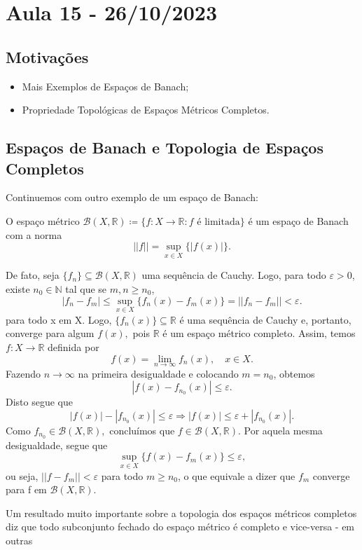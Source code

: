 \documentclass[MetricSpaces/metric_notes.tex]{subfiles}
\begin{document}
\section{Aula 15 - 26/10/2023}
\subsection{Motivações}
\begin{itemize}
	\item Mais Exemplos de Espaços de Banach;
	\item Propriedade Topológicas de Espaços Métricos Completos.
\end{itemize}
\subsection{Espaços de Banach e Topologia de Espaços Completos}
Continuemos com outro exemplo de um espaço de Banach:
\begin{example}
	O espaço métrico \(\mathcal{B}(X, \mathbb{R})\coloneqq \{f:X\rightarrow \mathbb{R}: f\text{ é limitada}\}\) é um espaço de Banach com a norma
	\[
		||f||=\sup_{x\in X}\{|f(x)|\}.
	\]

	De fato, seja \(\{f_{n}\}\subseteq{\mathcal{B}(X, \mathbb{R})}\) uma sequência de Cauchy. Logo, para todo \(\varepsilon >0\), existe \(n_{0}\in \mathbb{N}\) tal que
	se \(m, n\geq n_{0}\),
	\[
		|f_{n}-f_{m}|\leq \sup_{x\in X}\{f_{n}(x)-f_{m}(x)\} = ||f_{n}-f_{m}|| < \varepsilon .
	\]
	para todo x em X. Logo, \(\{f_{n}(x)\}\subseteq{\mathbb{R}}\) é uma sequência de Cauchy e, portanto, converge para algum \(f(x),\) pois \(\mathbb{R}\) é um espaço métrico completo.
	Assim, temos \(f:X\rightarrow \mathbb{R}\) definida por
	\[
		f(x) = \lim_{n\to \infty}f_{n}(x),\quad x\in X.
	\]
	Fazendo \(n\longrightarrow \infty\) na primeira desigualdade e colocando \(m=n_{0}\), obtemos
	\[
		|f(x)-f_{n_{0}}(x)|\leq \varepsilon .
	\]
	Disto segue que
	\[
		|f(x)| - |f_{n_{0}}(x)|\leq \varepsilon \Rightarrow |f(x)|\leq \varepsilon + |f_{n_{0}}(x)|.
	\]
	Como \(f_{n_{0}}\in \mathcal{B}(X, \mathbb{R}),\) concluímos que \(f\in \mathcal{B}(X, \mathbb{R}).\) Por aquela mesma desigualdade, segue que
	\[
		\sup_{x\in X}\{f(x)-f_{m}(x)\}\leq \varepsilon ,
	\]
	ou seja, \(||f-f_{m}|| < \varepsilon \) para todo \(m\geq n_{0}\), o que equivale a dizer que \(f_{m}\) converge para f em \(\mathcal{B}(X, \mathbb{R}).\)
\end{example}
Um resultado muito importante sobre a topologia dos espaços métricos completos diz que todo subconjunto fechado do espaço métrico é completo e vice-versa - em outras
\end{document}

